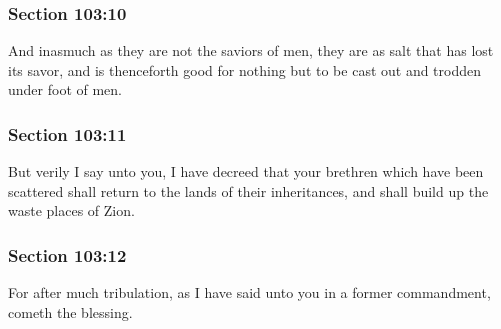 	\subsubsection{Section 103:10} %
		\label{DC103-10}

		And inasmuch as they are not the saviors of men, they are as salt that has lost its savor, and is thenceforth good for nothing but to be cast out and trodden under foot of men.


	\subsubsection{Section 103:11} %
		\label{DC103-11}

		But verily I say unto you, I have decreed that your brethren which have been scattered shall return to the lands of their inheritances, and shall build up the waste places of Zion.


	\subsubsection{Section 103:12} %
		\label{DC103-12}

		For after much tribulation, as I have said unto you in a former commandment, cometh the blessing.


